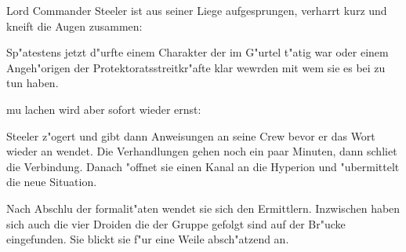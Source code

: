 
Lord Commander Steeler ist aus seiner Liege aufgesprungen, verharrt kurz und kneift die Augen zusammen:


Sp"atestens jetzt d"urfte einem Charakter der im G"urtel t"atig war oder einem Angeh"origen der Protektoratsstreitkr"afte klar wewrden mit wem sie es bei \xl{} zu tun haben.

\xl{} mu\3 lachen wird aber sofort wieder ernst:


Steeler z"ogert und gibt dann Anweisungen an seine Crew bevor er das Wort wieder an \xl{} wendet. Die Verhandlungen gehen noch ein paar Minuten, dann schlie\3t \xl{} die Verbindung. Danach "offnet sie einen Kanal an die Hyperion und "ubermittelt die neue Situation.

Nach Abschlu\3 der formalit"aten wendet sie sich den Ermittlern. Inzwischen haben sich auch die vier Droiden die der Gruppe gefolgt sind auf der Br"ucke eingefunden. Sie blickt sie f"ur eine Weile absch"atzend an.

\vfill\pagebreak

